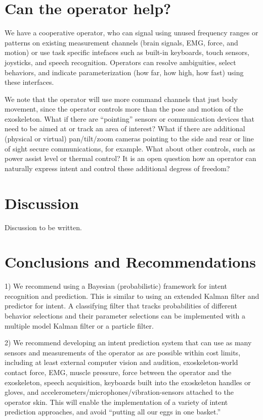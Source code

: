 \documentclass[letterpaper,12pt,fullpage]{article}
\begin{document}
\section{Can the operator help?}

We have a cooperative operator, who can signal using unused frequency
ranges or patterns on existing measurement
channels (brain signals, EMG, force, and motion) or use 
task specific intefaces such as built-in keyboards, touch sensors, joysticks,
and speech recognition.
Operators can resolve ambiguities, select behaviors, and indicate
parameterization (how far, how high, how fast) using these interfaces.

We note that the operator will use more command channels that just
body movement, since
the operator controls more than the pose and motion of the
exoskeleton. What if there are ``pointing'' sensors or communication
devices that need to be aimed at or track an area of interest? What if
there are additional (physical or virtual) pan/tilt/zoom cameras
pointing to the side and rear or line of sight secure communications,
for example. What about other controls, such as power assist level or
thermal control? It is an open question
how an operator can naturally express intent and
control these additional degress of freedom?

\section{Discussion}

Discussion to be written.

\section{Conclusions and Recommendations}

1) We recommend using a Bayesian (probabilistic) framework for intent recognition
and prediction. This is similar to using an extended
Kalman filter and predictor for intent.
A classifying filter that tracks probabilities of different behavior selections
and their parameter selections can be implemented with a multiple model Kalman
filter or a particle filter.

2) We recommend developing an intent prediction system that can use
as many sensors and measurements of the operator as are possible within cost limits,
including at least external computer vision and audition, exoskeleton-world contact
force,
EMG, muscle pressure, force between the operator and the
exoskeleton,
speech acquisition, keyboards built into the exoskeleton handles or gloves,
and accelerometers/microphones/vibration-sensors attached to the operator skin.
This will enable the implementation of a variety of intent prediction approaches,
and avoid ``putting all our eggs in one basket.''
\end{document}
